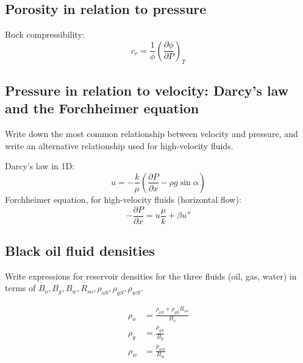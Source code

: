 \subsection{Porosity in relation to pressure} %
\label{sub:porosity_in_relation_to_pressure}
Rock compressibility:
\begin{equation}
  c_r = \frac{1}{\phi} \left( \frac{\partial \phi}{\partial P} \right)_T
\end{equation}


\subsection{Pressure in relation to velocity: Darcy's law and the Forchheimer equation} %
\label{sub:pressure_in_relation_to_velocity_darcy_s_law}

\begin{question}
  Write down the most common relationship between velocity and pressure, and write an alternative relationship used for high-velocity fluids.
\end{question}

Darcy's law in 1D:
\begin{equation}
  u = - \frac{k}{\mu} \left( \frac{\partial P}{\partial  x} - \rho g \sin \alpha \right)
\end{equation}
Forchheimer equation, for high-velocity fluids (horizontal flow):
\begin{equation}
  - \frac{\partial P}{\partial  x} = u \frac{\mu}{k} + \beta u''
\end{equation}


\subsection{Black oil fluid densities} %
\label{sub:black_oil_fluid_densities}

\begin{question}
  Write expressions for reservoir densities for the three fluids (oil, gas, water) in terms of $B_o, B_g, B_w, R_{so}, \rho_{oS}, \rho_{gS}, \rho_{wS}$.
\end{question}

\begin{align}
  \rho_o &= \frac{\rho_{oS} + \rho_{gS}R_{so}}{B_o} \\
  \rho_g &= \frac{\rho_{gS}}{B_g} \\
  \rho_w &= \frac{\rho_{wS}}{B_w}
\end{align}

